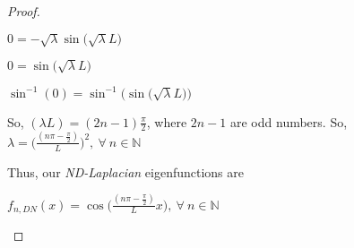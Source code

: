 \documentclass[executivepaper]{article}
\begin{document}
\begin{flushleft}
\begin{proof}
\begin{center}
$0=-\sqrt{\lambda} \sin\bigg(\sqrt{\lambda} L\bigg)$

\vspace{2mm}

$0=\sin\bigg(\sqrt{\lambda} L\bigg)$

\vspace{2mm}

$\sin^{-1}(0)=\sin^{-1}\Bigg(\sin\bigg(\sqrt{\lambda} L\bigg)\Bigg)$

\end{center}

So, $(\lambda L)=(2n-1)\frac{\pi}{2}$, where $2n-1$ are odd numbers. So, $\lambda=\bigg(\frac{(n \pi - \frac{\pi}{2})}{L}\bigg)^2,  ~ \forall ~ n \in \mathbb{N}$

Thus, our \textit{ND-Laplacian} eigenfunctions are

\begin{center}

$f_{n,DN}(x)=\cos\bigg(\frac{(n \pi - \frac{\pi}{2})}{L} x\bigg), ~ \forall ~ n \in \mathbb{N}$

\end{center}

\end{proof}

\end{flushleft}
\end{document}
